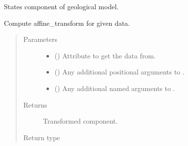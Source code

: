 \documentclass[letterpaper,10pt,english]{sphinxmanual}
\begin{document}
\begin{fulllineitems}
\label{\detokenize{api/states:geology.src.States}}
States component of geological model.

\begin{fulllineitems}
\label{\detokenize{api/states:geology.src.States.affine_transform}}
Compute affine\_transform for given data.
\begin{quote}\begin{description}
\item[{Parameters}] \leavevmode\begin{itemize}
\item {} 
 (\sphinxstyleliteralemphasis{\sphinxupquote{, }}) \textendash{} Attribute to get the data from.

\item {} 
 () \textendash{} Any additional positional arguments to .

\item {} 
 () \textendash{} Any additional named arguments to .

\end{itemize}

\item[{Returns}] \leavevmode
{} \textendash{} Transformed component.

\item[{Return type}] \leavevmode
{\hyperref[\detokenize{api/base_classes:geology.src.base_spatial.SpatialComponent}]{}}

\end{description}\end{quote}


\end{fulllineitems}
\end{fulllineitems}
\end{document}

